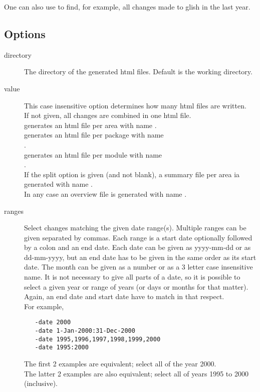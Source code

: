 One can also use  to find, for example, all
changes made to glish in the last year.

\subsection*{Options}

\begin{description}
\item[ directory]
   The directory of the generated html files.
   Default is the working directory.

\item[ value]
   This case insensitive option determines how many html files are written.
   \\If not given, all changes are combined in one html file.
   \\ generates an html file per area
   with name .
   \\ generates an html file per package
   with name
   \\.
   \\ generates an html file per module
   with name
   \\.
   \\If the split option is given (and not blank), a summary
   file per area ia generated with name
   .
   \\In any case an overview file is generated with name
   .

\item[ ranges]
   Select changes matching the given date range(s). Multiple ranges can be
   given separated by commas. Each range is a start date optionally
   followed by a colon and an end date.
   Each date can be given as yyyy-mm-dd or as dd-mm-yyyy, but an 
   end date has to be given in the same order as its start date.
   The month can be given as a number or as a 3 letter case
   insensitive name.
   It is not necessary to give all parts of a date, so it is possible
   to select a given year or range of years (or days or months for
   that matter). Again, an end date and start date have to match
   in that respect.
   \\For example,
\begin{verbatim}
   -date 2000
   -date 1-Jan-2000:31-Dec-2000
   -date 1995,1996,1997,1998,1999,2000
   -date 1995:2000
\end{verbatim}
   The first 2 examples are equivalent; select all of the year 2000.
   \\The latter 2 examples are also equivalent; select all of years
   1995 to 2000 (inclusive).


\end{description}
